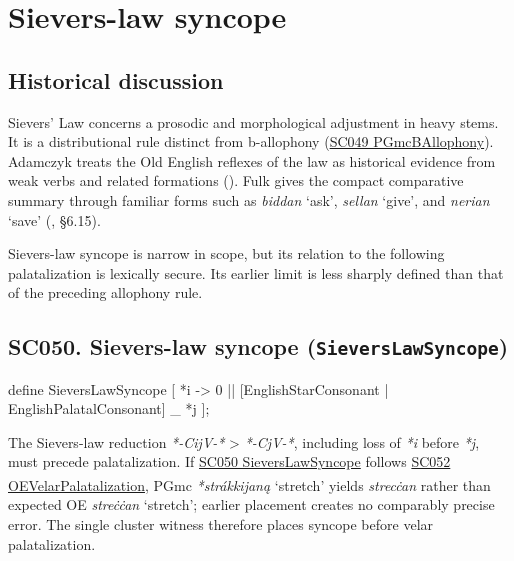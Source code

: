\documentclass[
  british,
  a4paper,
  openany]{book}
\providecommand{\Pred}[1]{\textsuperscript{\dag}\emph{#1}}
\providecommand{\Recon}[1]{\emph{*#1}}
{\catcode`→=\active \global\def→{\ensuremath{\rightarrow}}}
\providecommand{\texorpdfstring}[2]{#1}
\providecommand{\Pred}[1]{\textsuperscript{\dag}\emph{#1}}
\providecommand{\Recon}[1]{\emph{*#1}}
{\catcode`→=\active \global\def→{\ensuremath{\rightarrow}}}
\begin{document}
\newpage

\section{Sievers-law syncope}\label{sievers-law-syncope}

\subsection{Historical discussion}\label{historical-discussion-22}

Sievers' Law concerns a prosodic and morphological adjustment in heavy
stems. It is a distributional rule distinct from b-allophony
(\hyperref[rule-PGmcBAllophony]{SC049 PGmcBAllophony}). Adamczyk treats
the Old English reflexes of the law as historical evidence from weak
verbs and related formations (). Fulk gives the compact comparative summary through familiar
forms such as \emph{biddan} `ask', \emph{sellan} `give', and
\emph{nerian} `save' (, §6.15).

Sievers-law syncope is narrow in scope, but its relation to the
following palatalization is lexically secure. Its earlier limit is less
sharply defined than that of the preceding allophony rule.

\subsection{\texorpdfstring{SC050. Sievers-law syncope
(\texttt{SieversLawSyncope})}{SC050. Sievers-law syncope (SieversLawSyncope)}}\label{rule-SieversLawSyncope}

\begin{ReaderFacingFoma}
define SieversLawSyncope [
    {*i} -> 0 || [EnglishStarConsonant | EnglishPalatalConsonant] _ {*j}
];
\end{ReaderFacingFoma}

The Sievers-law reduction \emph{*-CijV-*} \textgreater{} \emph{*-CjV-*},
including loss of \emph{*i} before \emph{*j}, must precede
palatalization. If \hyperref[rule-SieversLawSyncope]{SC050
SieversLawSyncope} follows \hyperref[rule-OEVelarPalatalization]{SC052
OEVelarPalatalization}, PGmc \Recon{strákkijaną} `stretch' yields
\Pred{strecċan} rather than expected OE \emph{streċċan} `stretch';
earlier placement creates no comparably precise error. The single
cluster witness therefore places syncope before velar palatalization.
\end{document}
